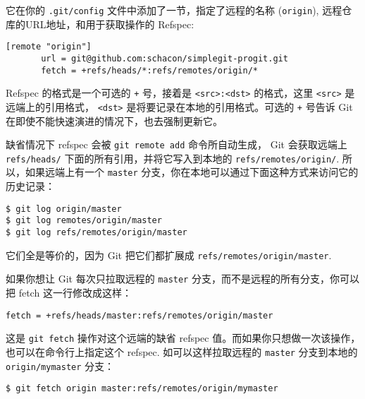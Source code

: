 \documentclass[a4paper]{book}
\begin{document}
它在你的 \texttt{.git/config} 文件中添加了一节，指定了远程的名称 (\texttt{origin}), 远程仓库的URL地址，和用于获取操作的 Refspec:

\begin{shaded}\begin{verbatim}
[remote "origin"]
       url = git@github.com:schacon/simplegit-progit.git
       fetch = +refs/heads/*:refs/remotes/origin/*
\end{verbatim}\end{shaded}

Refspec 的格式是一个可选的 \texttt{+} 号，接着是 \texttt{\textless{}src\textgreater{}:\textless{}dst\textgreater{}} 的格式，这里 \texttt{\textless{}src\textgreater{}} 是远端上的引用格式， \texttt{\textless{}dst\textgreater{}} 是将要记录在本地的引用格式。可选的 \texttt{+} 号告诉 Git 在即使不能快速演进的情况下，也去强制更新它。

缺省情况下 refspec 会被 \texttt{git remote add} 命令所自动生成， Git 会获取远端上 \texttt{refs/heads/} 下面的所有引用，并将它写入到本地的 \texttt{refs/remotes/origin/}. 所以，如果远端上有一个 \texttt{master} 分支，你在本地可以通过下面这种方式来访问它的历史记录：

\begin{shaded}\begin{verbatim}
$ git log origin/master
$ git log remotes/origin/master
$ git log refs/remotes/origin/master
\end{verbatim}\end{shaded}

它们全是等价的，因为 Git 把它们都扩展成 \texttt{refs/remotes/origin/master}.

如果你想让 Git 每次只拉取远程的 \texttt{master} 分支，而不是远程的所有分支，你可以把 fetch 这一行修改成这样：

\begin{shaded}\begin{verbatim}
fetch = +refs/heads/master:refs/remotes/origin/master
\end{verbatim}\end{shaded}

这是 \texttt{git fetch} 操作对这个远端的缺省 refspec 值。而如果你只想做一次该操作，也可以在命令行上指定这个 refspec. 如可以这样拉取远程的 \texttt{master} 分支到本地的 \texttt{origin/mymaster} 分支：

\begin{shaded}\begin{verbatim}
$ git fetch origin master:refs/remotes/origin/mymaster
\end{verbatim}\end{shaded}
\end{document}
